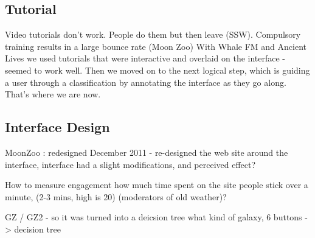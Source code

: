 \documentclass{sigchi}
\begin{document}



\subsection{Tutorial}

Video tutorials don't work. People do them but then leave (SSW).
Compulsory training results in a large bounce rate (Moon Zoo)
With Whale FM and Ancient Lives we used tutorials that were interactive and overlaid on the interface - seemed to work well.
Then we moved on to the next logical step, which is guiding a user through a classification by annotating the interface as they go along. That's where we are now.


\subsection{Interface Design}


MoonZoo : redesigned December 2011 - re-designed the web site around the interface, interface had a slight modifications, and perceived effect? %

How to measure engagement
  how much time spent on the site
  people stick over a minute, (2-3 mins, high is 20)
  (moderators of old weather)?

GZ / GZ2 - so it was turned into a deicsion tree
  what kind of galaxy, 6 buttons -> decision tree
\end{document}

